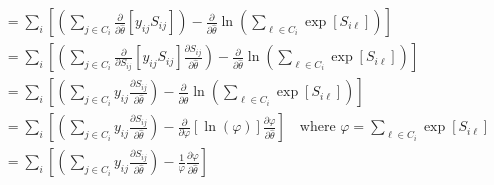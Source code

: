 \documentclass{article}
\begin{document}
\begin{equation*}
\begin{aligned}
&= \sum _i  \left[ \left( \sum _{j \in C_i} \frac{\partial}{\partial \hat{\theta}} \left[ y_{ij} S_{ij} \right] \right)  - \frac{\partial}{\partial \hat{\theta}} \ln \left( \sum _{\ell \in C_i} \exp \left[ S_{i \ell} \right] \right) \right] \\
&= \sum _i  \left[ \left( \sum _{j \in C_i} \frac{\partial}{\partial S_{ij}} \left[ y_{ij} S_{ij} \right] \frac{\partial S_{ij}}{\partial \hat{\theta}} \right)  - \frac{\partial}{\partial \hat{\theta}} \ln \left( \sum _{\ell \in C_i} \exp \left[ S_{i \ell} \right] \right) \right] \\
&= \sum _i  \left[ \left( \sum _{j \in C_i}  y_{ij} \frac{\partial S_{ij}}{\partial \hat{\theta}} \right)  - \frac{\partial}{\partial \hat{\theta}} \ln \left( \sum _{\ell \in C_i} \exp \left[ S_{i \ell} \right] \right) \right] \\
&= \sum _i  \left[ \left( \sum _{j \in C_i}  y_{ij} \frac{\partial S_{ij}}{\partial \hat{\theta}} \right)  - \frac{\partial}{\partial \varphi} \left[ \ln \left( \varphi \right) \right] \frac{\partial \varphi}{\partial \hat{\theta}} \right]  \quad \textrm{where $\varphi =  \sum _{\ell \in C_i} \exp \left[ S_{i \ell} \right] $}\\
&= \sum _i  \left[ \left( \sum _{j \in C_i}  y_{ij} \frac{\partial S_{ij}}{\partial \hat{\theta}} \right)  - \frac{1}{\varphi} \frac{\partial \varphi}{\partial \hat{\theta}} \right]
\end{aligned} 
\end{equation*}
\end{document}
